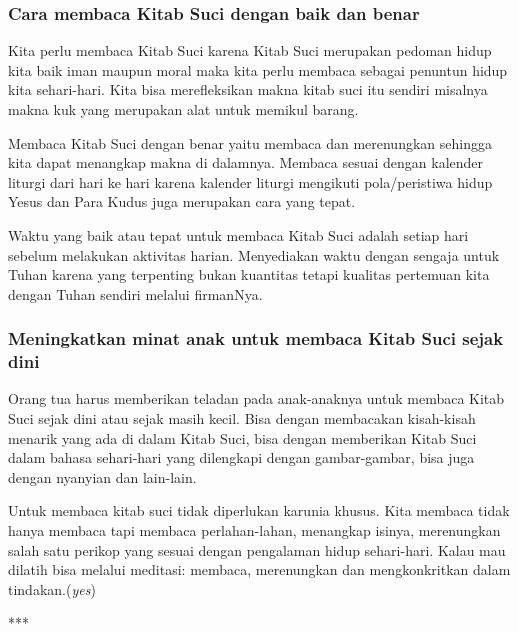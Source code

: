 \subsubsection*{Cara membaca Kitab Suci dengan baik dan benar}
Kita perlu membaca Kitab Suci karena Kitab Suci merupakan pedoman hidup kita baik iman maupun moral maka kita perlu membaca sebagai penuntun hidup kita sehari-hari. Kita bisa merefleksikan makna kitab suci itu sendiri misalnya makna kuk yang merupakan alat untuk memikul barang.  

Membaca Kitab Suci dengan benar yaitu membaca dan merenungkan sehingga kita dapat menangkap makna di dalamnya. Membaca sesuai dengan kalender liturgi dari hari ke hari karena kalender liturgi mengikuti pola/peristiwa hidup Yesus dan Para Kudus juga merupakan cara yang tepat.

Waktu yang baik atau tepat untuk membaca Kitab Suci adalah
setiap hari sebelum melakukan aktivitas harian. Menyediakan waktu dengan sengaja untuk Tuhan karena yang terpenting bukan kuantitas tetapi kualitas pertemuan kita dengan Tuhan sendiri melalui firmanNya.

\subsubsection*{Meningkatkan minat anak untuk membaca Kitab Suci sejak dini}
Orang tua harus memberikan teladan pada anak-anaknya untuk membaca Kitab Suci sejak dini atau sejak masih kecil. Bisa dengan membacakan kisah-kisah menarik yang ada di dalam Kitab Suci, bisa dengan memberikan Kitab Suci dalam bahasa sehari-hari yang dilengkapi dengan gambar-gambar, bisa juga dengan nyanyian dan lain-lain.

Untuk membaca kitab suci tidak diperlukan karunia khusus. Kita membaca tidak hanya membaca tapi membaca perlahan-lahan, menangkap isinya, merenungkan salah satu perikop yang sesuai dengan pengalaman hidup sehari-hari. Kalau mau dilatih bisa melalui meditasi: membaca, merenungkan dan mengkonkritkan dalam tindakan.(\emph{yes})

\begin{center} ***\end{center}
